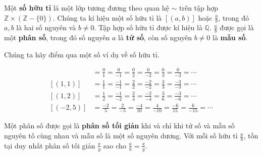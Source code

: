 \begin{definition}[Số hữu tỉ]
	Một \textbf{số hữu tỉ} là một lớp tương đương theo quan hệ $\sim$ trên tập hợp $\mathbb{Z}\times (\mathbb{Z} - \{0\})$. Chúng ta kí hiệu một số hữu tỉ là $[(a, b)]$ hoặc $\frac{a}{b}$, trong đó $a, b$ là hai số nguyên và $b\ne 0$. Tập hợp số hữu tỉ được kí hiệu là $\mathbb{Q}$.  $\frac{a}{b}$ được gọi là một \textbf{phân số}, trong đó số nguyên $a$ là \textbf{tử số}, còn số nguyên $b\ne 0$ là \textbf{mẫu số}.
\end{definition}

Chúng ta hãy điểm qua một số ví dụ về số hữu tỉ.
\begin{example}
	\begin{align*}
		[(0, 1)] & = \frac{0}{1} = \frac{0}{-1} = \frac{0}{2} = \frac{0}{-2} = \frac{0}{3} = \frac{0}{-3} = \cdots        \\
		[(1, 1)] & = \frac{1}{1} = \frac{-1}{-1} = \frac{2}{2} = \frac{-2}{-2} = \frac{3}{3} = \frac{-3}{-3} = \cdots     \\
		[(1, 2)] & = \frac{1}{2} = \frac{-1}{-2} = \frac{2}{4} = \frac{-2}{-4} = \frac{3}{6} = \frac{-3}{-6} = \cdots     \\
		[(-2,5)] & = \frac{-2}{5} = \frac{2}{-5} = \frac{-4}{10} = \frac{4}{-10} = \frac{-6}{15} = \frac{6}{-15} = \cdots
	\end{align*}
\end{example}

\begin{theorem}
	Một phân số được gọi là \textbf{phân số tối giản} khi và chỉ khi tử số và mẫu số nguyên tố cùng nhau và mẫu số là một số nguyên dương. Với mỗi số hữu tỉ $\frac{a}{b}$, tồn tại duy nhất phân số tối giản $\frac{x}{y}$ sao cho $\frac{a}{b} = \frac{x}{y}$.
\end{theorem}

